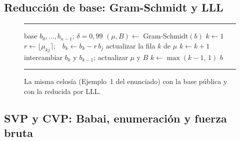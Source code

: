 \subsection{Reducción de base: Gram-Schmidt y LLL}

\begin{figure}[H]
\begin{minipage}[c]{0.58\linewidth}
  \label{alg:lll}
  \vspace{-4pt}\hrule\vspace{2pt}
  \begin{algorithmic}[1]
    \small
    \Require base $b_0, \dots, b_{n-1}$; $\delta = 0{,}99$
    \State $(\mu, B) \gets$ Gram-Schmidt$(b)$ 
    \State $k \gets 1$
       
        \State $r \gets \lfloor \mu_{kj} \rceil$;\ \ $b_k \gets b_k - r\,b_j$
        \State actualizar la fila $k$ de $\mu$
      \EndFor
       
        \State $k \gets k + 1$
      \Else
        \State intercambiar $b_k$ y $b_{k-1}$; actualizar $\mu$ y $B$
        \State $k \gets \max(k - 1,\, 1)$
      \EndIf
    \EndWhile
    \State \Return $b$
  \end{algorithmic}
  \vspace{2pt}\hrule
\end{minipage}\hfill
\begin{minipage}[c]{0.38\linewidth}
  \centering
  
  \caption{La misma celosía (Ejemplo~1 del enunciado) con la base pública y con la reducida
    por LLL.}
  \label{fig:celosia}
\end{minipage}
\end{figure}


\subsection{SVP y CVP: Babai, enumeración y fuerza bruta}

